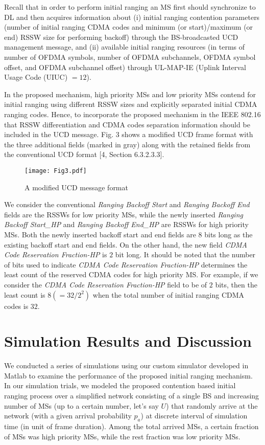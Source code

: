 \documentclass[preprint,12pt]{elsarticle}
\begin{document}
Recall that in order to perform initial ranging an MS first should synchronize to DL and then  acquires information about (i) initial ranging contention parameters  (number of initial ranging CDMA codes and minimum (or start)/maximum (or end) RSSW size for performing backoff) through the BS-broadcasted UCD management message, and (ii) available initial ranging resources (in terms of number of OFDMA symbols, number of OFDMA subchannels, OFDMA symbol offset, and OFDMA subchannel offset) through UL-MAP-IE (Uplink Interval Usage Code (UIUC) $= 12$).

In the proposed mechanism, high priority MSs and low priority MSs contend for initial ranging using different RSSW sizes and explicitly separated initial CDMA ranging codes. Hence, to incorporate the proposed mechanism in the IEEE 802.16 that RSSW differentiation and CDMA codes separation information should be included in the UCD message. Fig. 3 shows a modified UCD frame format with the three additional fields (marked in gray) along with the retained fields from the conventional UCD format [4, Section 6.3.2.3.3].


\begin{figure}[h]
\centering
\texttt{[image: Fig3.pdf]}
\centering
\caption{A modified UCD message format}
\end{figure}


We consider the conventional \emph{Ranging Backoff Start} and \emph{Ranging Backoff End} fields are the RSSWs for low priority MSs, while the newly inserted \emph{Ranging Backoff Start\_HP} and \emph{Ranging Backoff End\_HP} are RSSWs for high priority MSs.  Both the newly inserted backoff start and end fields are $8$ bits long as the existing backoff start and end fields. On the other hand, the new field \emph{CDMA Code Reservation Fraction-HP} is $2$ bit long. It should be noted that the number of bits used to indicate \emph{CDMA Code Reservation Fraction-HP} determines the least count of the reserved CDMA codes for high priority MS. For example, if we consider the \emph{CDMA Code Reservation Fraction-HP} field to be of $2$ bits, then the least count is $8 (= 32/2^2)$ when the total number of initial ranging CDMA codes is $32$.

\section{Simulation Results and Discussion}

We conducted a series of simulations using our custom simulator developed in Matlab to examine the performance of the proposed initial ranging mechanism. In our simulation trials, we modeled the proposed contention based initial ranging process over a simplified network consisting of a single BS and increasing number of MSs (up to a certain number, let’s say $U$) that randomly arrive at the network (with a given arrival probability $p_a$) at discrete interval of simulation time (in unit of frame duration). Among the total arrived MSs, a certain fraction of MSs was high priority MSs, while the rest fraction was low priority MSs.
\end{document}

